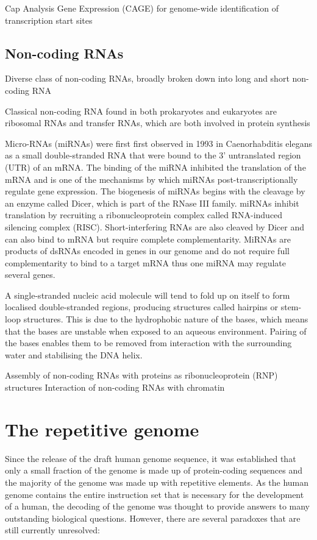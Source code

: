 Cap Analysis Gene Expression (CAGE) for genome-wide identification of transcription start sites

\subsection{Non-coding RNAs}

Diverse class of non-coding RNAs, broadly broken down into long and short non-coding RNA

Classical non-coding RNA found in both prokaryotes and eukaryotes are ribosomal RNAs and transfer RNAs, which are both involved in protein synthesis

Micro-RNAs (miRNAs) were first first observed in 1993 in Caenorhabditis elegans\cite{pmid8252621} as a small double-stranded RNA that were bound to the 3' untranslated region (UTR) of an mRNA. The binding of the miRNA inhibited the translation of the mRNA and is one of the mechanisms by which miRNAs post-transcriptionally regulate gene expression. The biogenesis of miRNAs begins with the cleavage by an enzyme called Dicer\cite{pmid11201747}, which is part of the RNase III family. miRNAs inhibit translation by recruiting a ribonucleoprotein complex called RNA-induced silencing complex (RISC). Short-interfering RNAs are also cleaved by Dicer and can also bind to mRNA but require complete complementarity. MiRNAs are products of dsRNAs encoded in genes in our genome and do not require full complementarity to bind to a target mRNA thus one miRNA may regulate several genes.

A single-stranded nucleic acid molecule will tend to fold up on itself to form localised double-stranded regions, producing structures called hairpins or stem-loop structures. This is due to the hydrophobic nature of the bases, which means that the bases are unstable when exposed to an aqueous environment. Pairing of the bases enables them to be removed from interaction with the surrounding water and stabilising the DNA helix.

Assembly of non-coding RNAs with proteins as ribonucleoprotein (RNP) structures
Interaction of non-coding RNAs with chromatin

\section{The repetitive genome}

Since the release of the draft human genome sequence\cite{venter2001sequence, lander2001initial}, it was established that only a small fraction of the genome is made up of protein-coding sequences and the majority of the genome was made up with repetitive elements. As the human genome contains the entire instruction set that is necessary for the development of a human, the decoding of the genome was thought to provide answers to many outstanding biological questions. However, there are several paradoxes that are still currently unresolved:


